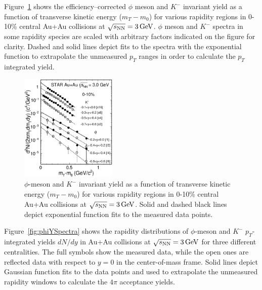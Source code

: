 \documentclass[%
 reprint,	
showpacs,
 amsmath,amssymb,
 aps,
 prc,
]{revtex4-1}
\begin{document}
Figure~\ref{fig:phimTSpectra} shows the efficiency--corrected $\phi$ meson and $K^-$ invariant yield as a function of transverse kinetic energy ($m_T-m_0$) for various rapidity regions in 0-10\% central Au+Au collisions at ${\sqrt{s_{\rm NN}} = \rm{3\,GeV}}$. $\phi$ meson and $K^-$ spectra in some rapidity species are scaled with arbitrary factors indicated on the figure for clarity. Dashed and solid lines depict fits to the spectra with the exponential function to extrapolate the unmeasured $p_T$ ranges in order to calculate the $p_T$ integrated yield.


\begin{figure}
\centering
\includegraphics[width=0.41\textwidth]{fig/fig2_h_mT_spectra_phiMeson.eps}
  \caption{ $\phi$-meson and $K^-$ invariant yield as a function of transverse kinetic energy ($m_T-m_0$) for various rapidity regions in 0-10\% central Au+Au collisions at ${\sqrt{s_{\rm NN}} = \rm{3\,GeV}}$. Solid and dashed black lines depict exponential function fits to the measured data points.}
\label{fig:phimTSpectra} 
\end{figure}


Figure~\ref{fig:phiYSpectra} shows the rapidity distributions of $\phi$-meson and $K^-$ $p_T$-integrated yields $dN/dy$ in Au+Au collisions at ${\sqrt{s_{\rm NN}} = \rm{3\,GeV}}$ for three different centralities. The full symbols show the measured data, while the open ones are reflected data with respect to $y=0$ in the center-of-mass frame. Solid lines depict Gaussian function fits to the data points and used to extrapolate the unmeasured rapidity windows to calculate the $4\pi$ acceptance yields.
\end{document}
